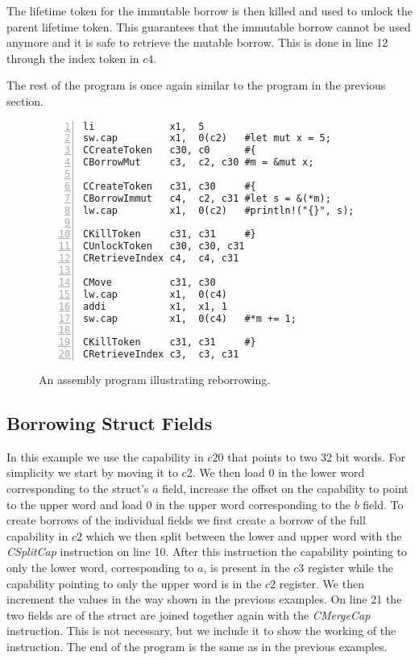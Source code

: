The lifetime token for the immutable borrow is then killed and used to unlock the parent lifetime token.
This guarantees that the immutable borrow cannot be used anymore and it is safe to retrieve the mutable borrow.
This is done in line 12 through the index token in $c4$.

The rest of the program is once again similar to the program in the previous section.
\begin{figure}[h]
\begin{lstlisting}[style=custASM, numbers = left ,xleftmargin=1.5em]
li             x1,  5
sw.cap         x1,  0(c2)   #let mut x = 5;
CCreateToken   c30, c0      #{
CBorrowMut     c3,  c2, c30 #m = &mut x;

CCreateToken   c31, c30     #{
CBorrowImmut   c4,  c2, c31 #let s = &(*m);
lw.cap         x1,  0(c2)   #println!("{}", s);

CKillToken     c31, c31     #}
CUnlockToken   c30, c30, c31
CRetrieveIndex c4,  c4, c31

CMove          c31, c30
lw.cap         x1,  0(c4)
addi           x1,  x1, 1
sw.cap         x1,  0(c4)   #*m += 1;

CKillToken     c31, c31     #}
CRetrieveIndex c3,  c3, c31
\end{lstlisting}
\caption{An assembly program illustrating reborrowing.}
\label{fig:asmreborrowexample}
\end{figure}

\subsection{Borrowing Struct Fields}
In this example we use the capability in $c20$ that points to two 32 bit words.
For simplicity we start by moving it to $c2$.
We then load 0 in the lower word corresponding to the struct's $a$ field, increase the offset on the capability to point to the upper word and load 0 in the upper word corresponding to the $b$ field.
To create borrows of the individual fields we first create a borrow of the full capability in $c2$ which we then split between the lower and upper word with the \textit{CSplitCap} instruction on line 10.
After this instruction the capability pointing to only the lower word, corresponding to $a$, is present in the $c3$ register while the capability pointing to only the upper word is in the $c2$ register.
We then increment the values in the way shown in the previous examples.
On line 21 the two fields are of the struct are joined together again with the \textit{CMergeCap} instruction.
This is not necessary, but we include it to show the working of the instruction.
The end of the program is the same as in the previous examples.

